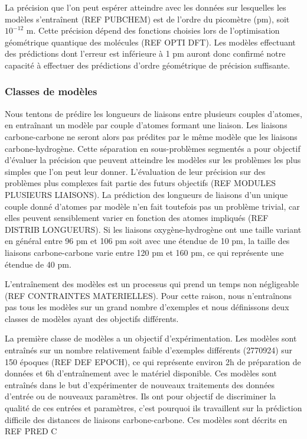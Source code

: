 \par La précision que l'on peut espérer atteindre avec les données sur lesquelles les modèles s'entraînent (REF PUBCHEM) est de l'ordre du picomètre (pm), soit $10^{-12}$ m. Cette précision dépend des fonctions choisies lors de l'optimisation géométrique quantique des molécules (REF OPTI DFT). Les modèles effectuant des prédictions dont l'erreur est inférieure à 1 pm auront donc confirmé notre capacité à effectuer des prédictions d'ordre géométrique de précision suffisante.

\subsubsection{Classes de modèles}
\par Nous tentons de prédire les longueurs de liaisons entre plusieurs couples d'atomes, en entraînant un modèle par couple d'atomes formant une liaison. Les liaisons carbone-carbone ne seront alors pas prédites par le même modèle que les liaisons carbone-hydrogène. Cette séparation en sous-problèmes segmentés a pour objectif d'évaluer la précision que peuvent atteindre les modèles sur les problèmes les plus simples que l'on peut leur donner. L'évaluation de leur précision sur des problèmes plus complexes fait partie des futurs objectifs (REF	MODULES PLUSIEURS LIAISONS). La prédiction des longueurs de liaisons d'un unique couple donné d'atomes par modèle n'en fait toutefois pas un problème trivial, car elles peuvent sensiblement varier en fonction des atomes impliqués (REF DISTRIB LONGUEURS). Si les liaisons oxygène-hydrogène ont une taille variant en général entre 96 pm et 106 pm soit avec une étendue de 10 pm, la taille des liaisons carbone-carbone varie entre 120 pm et 160 pm, ce qui représente une étendue de 40 pm. \\
\par L'entraînement des modèles est un processus qui prend un temps non négligeable (REF CONTRAINTES MATERIELLES). Pour cette raison, nous n'entraînons pas tous les modèles sur un grand nombre d'exemples et nous définissons deux classes de modèles ayant des objectifs différents. \\
\par La première classe de modèles a un objectif d'expérimentation. Les modèles sont entraînés sur un nombre relativement faible d'exemples différents (2770924) sur 150 époques (REF DEF EPOCH), ce qui représente environ 2h de préparation de données et 6h d'entraînement avec le matériel disponible. Ces modèles sont entraînés dans le but d'expérimenter de nouveaux traitements des données d'entrée ou de nouveaux paramètres. Ils ont pour objectif de discriminer la qualité de ces entrées et paramètres, c'est pourquoi ils travaillent sur la prédiction difficile des distances de liaisons carbone-carbone. Ces modèles sont décrits en REF PRED C\\

